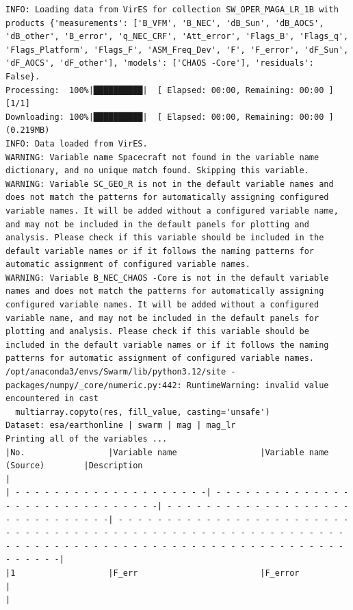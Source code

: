 \begin{verbatim}
INFO: Loading data from VirES for collection SW_OPER_MAGA_LR_1B with products {'measurements': ['B_VFM', 'B_NEC', 'dB_Sun', 'dB_AOCS', 'dB_other', 'B_error', 'q_NEC_CRF', 'Att_error', 'Flags_B', 'Flags_q', 'Flags_Platform', 'Flags_F', 'ASM_Freq_Dev', 'F', 'F_error', 'dF_Sun', 'dF_AOCS', 'dF_other'], 'models': ['CHAOS -Core'], 'residuals': False}.
Processing:  100%|██████████|  [ Elapsed: 00:00, Remaining: 00:00 ] [1/1] 
Downloading: 100%|██████████|  [ Elapsed: 00:00, Remaining: 00:00 ] (0.219MB)
INFO: Data loaded from VirES.
WARNING: Variable name Spacecraft not found in the variable name dictionary, and no unique match found. Skipping this variable.
WARNING: Variable SC_GEO_R is not in the default variable names and does not match the patterns for automatically assigning configured variable names. It will be added without a configured variable name, and may not be included in the default panels for plotting and analysis. Please check if this variable should be included in the default variable names or if it follows the naming patterns for automatic assignment of configured variable names.
WARNING: Variable B_NEC_CHAOS -Core is not in the default variable names and does not match the patterns for automatically assigning configured variable names. It will be added without a configured variable name, and may not be included in the default panels for plotting and analysis. Please check if this variable should be included in the default variable names or if it follows the naming patterns for automatic assignment of configured variable names.
/opt/anaconda3/envs/Swarm/lib/python3.12/site -packages/numpy/_core/numeric.py:442: RuntimeWarning: invalid value encountered in cast
  multiarray.copyto(res, fill_value, casting='unsafe')
Dataset: esa/earthonline | swarm | mag | mag_lr
Printing all of the variables ...
|No.                 |Variable name                 |Variable name (Source)        |Description                                                                                         |
| - - - - - - - - - - - - - - - - - - - -| - - - - - - - - - - - - - - - - - - - - - - - - - - - - - -| - - - - - - - - - - - - - - - - - - - - - - - - - - - - - -| - - - - - - - - - - - - - - - - - - - - - - - - - - - - - - - - - - - - - - - - - - - - - - - - - - - - - - - - - - - - - - - - - - - - - - - - - - - - - - - - - - - - - - - - - - - - - - - - - - - -|
|1                   |F_err                         |F_error                       |                                                                                                    |

\end{verbatim}

